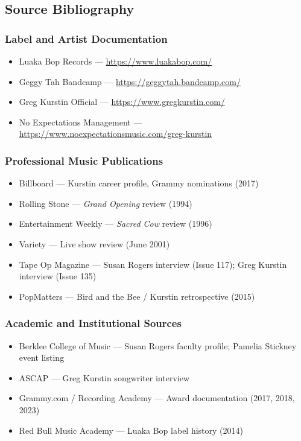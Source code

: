 \documentclass[11pt,letterpaper]{article}
\begin{document}
\subsection{Source Bibliography}

\subsubsection{Label and Artist Documentation}
\begin{itemize}[leftmargin=2em]
\item Luaka Bop Records --- \url{https://www.luakabop.com/}
\item Geggy Tah Bandcamp --- \url{https://geggytah.bandcamp.com/}
\item Greg Kurstin Official --- \url{https://www.gregkurstin.com/}
\item No Expectations Management --- \url{https://www.noexpectationsmusic.com/greg-kurstin}
\end{itemize}

\subsubsection{Professional Music Publications}
\begin{itemize}[leftmargin=2em]
\item Billboard --- Kurstin career profile, Grammy nominations (2017)
\item Rolling Stone --- \textit{Grand Opening} review (1994)
\item Entertainment Weekly --- \textit{Sacred Cow} review (1996)
\item Variety --- Live show review (June 2001)
\item Tape Op Magazine --- Susan Rogers interview (Issue 117); Greg Kurstin interview (Issue 135)
\item PopMatters --- Bird and the Bee / Kurstin retrospective (2015)
\end{itemize}

\subsubsection{Academic and Institutional Sources}
\begin{itemize}[leftmargin=2em]
\item Berklee College of Music --- Susan Rogers faculty profile; Pamelia Stickney event listing
\item ASCAP --- Greg Kurstin songwriter interview
\item Grammy.com / Recording Academy --- Award documentation (2017, 2018, 2023)
\item Red Bull Music Academy --- Luaka Bop label history (2014)
\end{itemize}
\end{document}
